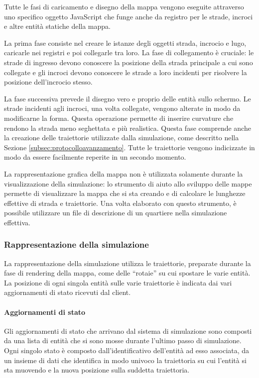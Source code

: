 Tutte le fasi di caricamento e disegno della mappa vengono eseguite attraverso
uno specifico oggetto JavaScript che funge anche da registro per le strade,
incroci e altre entità statiche della mappa.

La prima fase consiste nel creare le istanze degli oggetti strada, incrocio e
lugo, caricarle nei registri e poi collegarle tra loro. La fase di collegamento
è cruciale: le strade di ingresso devono conoscere la posizione della strada
principale a cui sono collegate e gli incroci devono conoscere le strade a loro
incidenti per risolvere la posizione dell'incrocio stesso.

La fase successiva prevede il disegno vero e proprio delle entità sullo schermo.
Le strade incidenti agli incroci, una volta collegate, vengono alterate in modo
da modificarne la forma. Questa operazione permette di inserire curvature che
rendono la strada meno seghettata e più realistica.
Questa fase comprende anche la creazione delle traiettorie utilizzate dalla
simulazione, come descritto nella Sezione \ref{subsec:protocolloavanzamento}.
Tutte le traiettorie vengono indicizzate in modo da essere facilmente reperite
in un secondo momento.

La rappresentazione grafica della mappa non è utilizzata solamente durante la
visualizzazione della simulazione: lo strumento di aiuto allo sviluppo delle
mappe permette di visualizzare la mappa che si sta creando e di calcolare le
lunghezze effettive di strada e traiettorie.
Una volta elaborato con questo strumento, è possibile utilizzare un file di
descrizione di un quartiere nella simulazione effettiva.

\subsubsection{Rappresentazione della simulazione}
La rappresentazione della simulazione utilizza le traiettorie, preparate durante
la fase di rendering della mappa, come delle ``rotaie'' su cui spostare le varie
entità. La posizione di ogni singola entità sulle varie traiettorie è indicata
dai vari aggiornamenti di stato ricevuti dal client.

\paragraph*{Aggiornamenti di stato}
Gli aggiornamenti di stato che arrivano dal sistema di simulazione sono composti
da una lista di entità che si sono mosse durante l'ultimo passo di simulazione. 
Ogni singolo stato è composto dall'identificativo dell'entità ad esso associata,
da un insieme di dati che identifica in modo univoco la traiettoria su cui
l'entità si sta muovendo e la nuova posizione sulla suddetta traiettoria.

